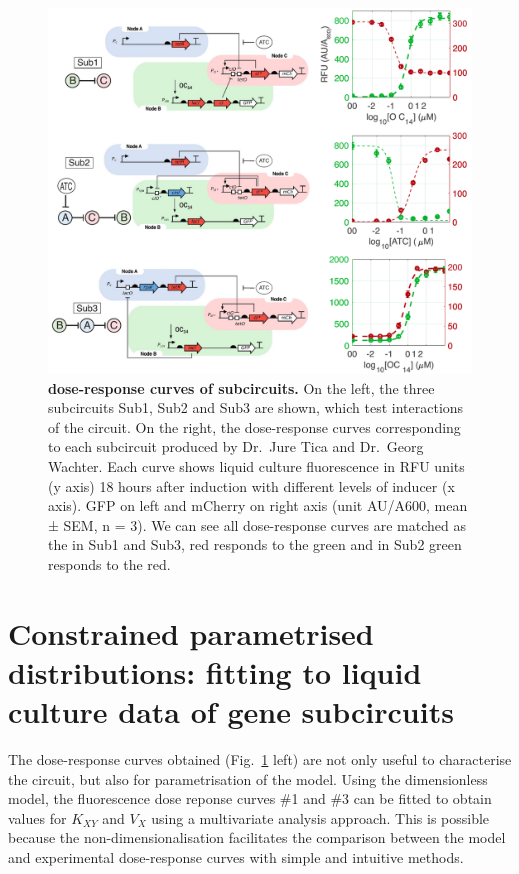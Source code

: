 \begin{figure}[H] %
    \centering
    \begin{adjustbox}{center}
        \includegraphics[width=1\textwidth]{chapters/Chapter 2/dose_response_experimental} %
    \end{adjustbox}
    \caption{\textbf{dose-response curves of subcircuits.}
    On the left, the three subcircuits Sub1, Sub2 and Sub3 are shown, which test interactions of the circuit. On the right, the dose-response curves corresponding to each subcircuit produced by Dr.~Jure Tica and Dr.~Georg Wachter. Each curve shows liquid culture fluorescence in RFU units (y axis) 18 hours after induction with different levels of inducer (x axis).
    GFP on left and mCherry on right axis (unit AU/A600, mean ± SEM, n = 3). We can see all dose-response curves are matched as the in Sub1 and Sub3, red responds to the green and in Sub2 green responds to the red.}
    \label{fig:dose_response_experimental} %
\end{figure}
\section{Constrained parametrised distributions:
fitting to liquid culture data of gene subcircuits}\label{Constrained parametrised distributions: fitting to liquid culture data of gene subcircuits}
The dose-response curves obtained (Fig.~\ref{fig:dose_response_experimental} left)
are not only useful to characterise the circuit,
but also for parametrisation of the model.
Using the dimensionless model,
the fluorescence dose reponse curves \#1 and \#3 can be fitted
to obtain values for $K_{XY}$ and $V_{X}$ using a multivariate analysis approach.
This is possible because the non-dimensionalisation facilitates the comparison between the model and experimental dose-response curves with simple and intuitive methods.


